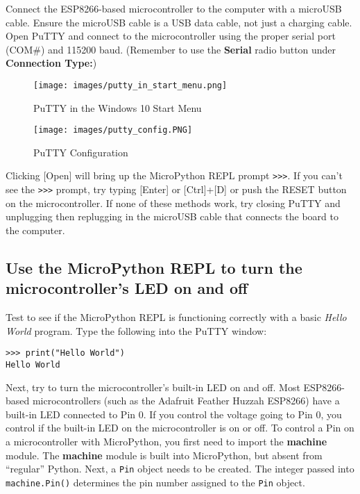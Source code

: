 \documentclass{book}
\makeatletter
\def\maxwidth{\ifdim\Gin@nat@width>\linewidth\linewidth
\else\Gin@nat@width\fi}
\let\Oldincludegraphics\includegraphics
\renewcommand{\includegraphics}[1]{\Oldincludegraphics[width=.8\maxwidth]{#1}}
\newcommand{\passthrough}[1]{#1}
\makeatother
\begin{document}
    
        Connect the ESP8266-based microcontroller to the computer with a
microUSB cable. Ensure the microUSB cable is a USB data cable, not just
a charging cable. Open PuTTY and connect to the microcontroller using
the proper serial port (COM\#) and 115200 baud. (Remember to use the
\textbf{Serial} radio button under \textbf{Connection Type:})

\begin{figure}
\centering
\texttt{[image: images/putty\_in\_start\_menu.png]}
\caption{PuTTY in the Windows 10 Start Menu}
\end{figure}

\begin{figure}
\centering
\texttt{[image: images/putty\_config.PNG]}
\caption{PuTTY Configuration}
\end{figure}

Clicking {[}Open{]} will bring up the MicroPython REPL prompt
\passthrough{\lstinline!>>>!}. If you can't see the
\passthrough{\lstinline!>>>!} prompt, try typing {[}Enter{]} or
{[}Ctrl{]}+{[}D{]} or push the RESET button on the microcontroller. If
none of these methods work, try closing PuTTY and unplugging then
replugging in the microUSB cable that connects the board to the
computer.
    




    
        \hypertarget{use-the-micropython-repl-to-turn-the-microcontrollers-led-on-and-off}{%
\subsection{Use the MicroPython REPL to turn the microcontroller's LED
on and
off}\label{use-the-micropython-repl-to-turn-the-microcontrollers-led-on-and-off}}
    




    
        Test to see if the MicroPython REPL is functioning correctly with a
basic \emph{Hello World} program. Type the following into the PuTTY
window:

\begin{lstlisting}
>>> print("Hello World")
Hello World
\end{lstlisting}

Next, try to turn the microcontroller's built-in LED on and off. Most
ESP8266-based microcontrollers (such as the Adafruit Feather Huzzah
ESP8266) have a built-in LED connected to Pin 0. If you control the
voltage going to Pin 0, you control if the built-in LED on the
microcontroller is on or off. To control a Pin on a microcontroller with
MicroPython, you first need to import the \textbf{machine} module. The
\textbf{machine} module is built into MicroPython, but absent from
``regular'' Python. Next, a \passthrough{\lstinline!Pin!} object needs
to be created. The integer passed into
\passthrough{\lstinline!machine.Pin()!} determines the pin number
assigned to the \passthrough{\lstinline!Pin!} object.
\end{document}
